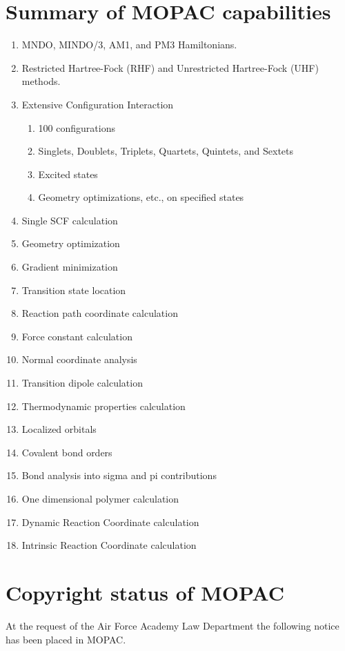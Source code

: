 \documentclass[11pt]{book}
\newcommand{\mi}[1]{#1\index{#1}}
\begin{document}
\section{Summary of MOPAC capabilities}
\begin{enumerate}
\item MNDO, MINDO/3, AM1, and PM3 Hamiltonians.
\item Restricted  Hartree-Fock  (RHF)  and  Unrestricted  Hartree-Fock
      (UHF) methods.
\item Extensive Configuration Interaction
  \begin{enumerate}
     \item 100 configurations
     \item Singlets,  Doublets, Triplets, Quartets, Quintets, and Sextets
     \item Excited states
     \item Geometry optimizations, etc., on specified states
  \end{enumerate}
 \item Single SCF calculation
 \item Geometry optimization
 \item Gradient minimization
 \item Transition state location
 \item Reaction path coordinate calculation
 \item Force constant calculation
 \item Normal coordinate analysis
 \item Transition dipole calculation
 \item Thermodynamic properties calculation
 \item \mi{Localized orbitals}
 \item Covalent bond orders
 \item Bond analysis into sigma and pi contributions
 \item One dimensional polymer calculation
 \item Dynamic Reaction Coordinate calculation
 \item Intrinsic Reaction Coordinate calculation
\end{enumerate}

\section{Copyright status of MOPAC}
At the request of the Air Force Academy Law Department the following
notice has been placed in MOPAC.
\end{document}
